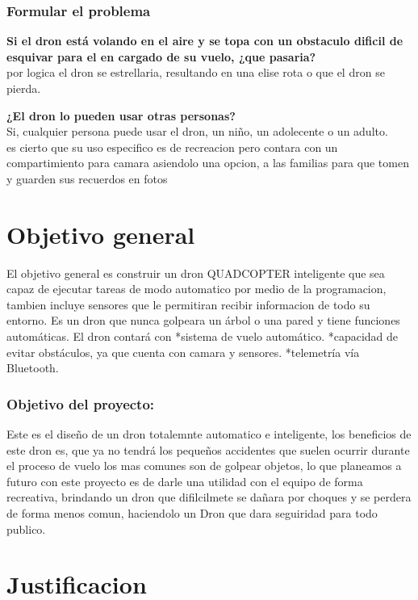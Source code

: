 \documentclass[11pt,a4paper]{article}
\begin{document}
\section{Formular el problema}
\textbf{Si el dron está volando en el aire y se topa con un obstaculo dificil de esquivar para el en cargado de su vuelo, ¿que pasaria?}\\
por logica el dron se estrellaria, resultando en una elise rota o que el dron se pierda.

\textbf{¿El dron lo pueden usar otras personas?}\\
Si, cualquier persona puede usar el dron, un niño, un adolecente o un adulto.\\
es cierto que su uso especifico es de recreacion pero contara con un compartimiento para camara asiendolo una opcion, a las familias para que tomen y guarden sus recuerdos en fotos 

\part{Objetivo general}
El objetivo general es construir un dron QUADCOPTER inteligente
que sea capaz de ejecutar tareas de modo automatico por medio de la programacion, tambien incluye sensores que le permitiran recibir informacion de todo su entorno.
Es un dron que nunca golpeara un árbol o
una pared y tiene funciones automáticas.
El dron contará con
*sistema de vuelo automático.
*capacidad de evitar obstáculos, ya que cuenta con camara y sensores.
*telemetría vía Bluetooth.

\section{Objetivo del proyecto:}

Este es el diseño de un dron totalemnte automatico e inteligente, los beneficios de este dron es, que ya no tendrá los pequeños accidentes que suelen ocurrir durante el proceso de vuelo los mas comunes son de golpear objetos, lo que planeamos a futuro con este proyecto es de darle una utilidad con el equipo de forma recreativa, brindando un dron que difilcilmete se dañara por choques y se perdera de forma menos comun, haciendolo un Dron que dara seguiridad para todo publico.

\newpage 


\part{Justificacion}
\end{document}
